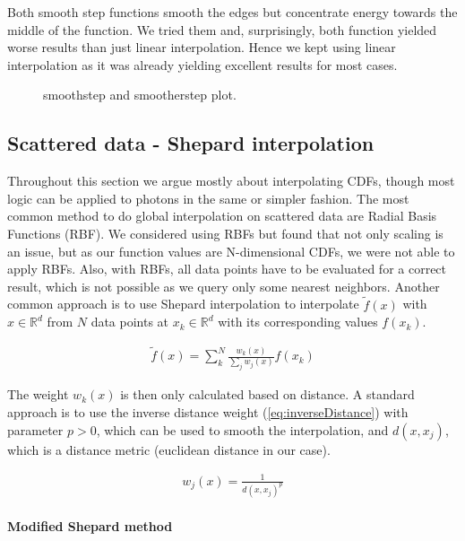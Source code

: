 Both smooth step functions smooth the edges but concentrate energy towards the middle of the function. We tried them and, surprisingly, both function yielded worse results than just linear interpolation. Hence we kept using linear interpolation as it was already yielding excellent results for most cases.

\begin{figure}[htbp] 
	\centering
	\tiny
    
    \caption{smoothstep and smootherstep plot. } 
    \label{fig:smoothstep}
\end{figure}

\subsection{Scattered data - Shepard interpolation}
\label{ch:unstructured}

Throughout this section we argue mostly about interpolating CDFs, though most logic can be applied to photons in the same or simpler fashion. The most common method to do global interpolation on scattered data are Radial Basis Functions (RBF). We considered using RBFs but found that not only scaling is an issue, but as our function values are N-dimensional CDFs, we were not able to apply RBFs. Also, with RBFs, all data points have to be evaluated for a correct result, which is not possible as we query only some nearest neighbors. Another common approach is to use Shepard interpolation to interpolate $\widetilde{f}(x)$ with $x \in \mathbb{R}^d$ from $N$ data points at $x_k \in \mathbb{R}^d$ with its corresponding values $f(x_k)$. 

\begin{align}\label{eq:shepard}
\widetilde{f}(x) = \sum_{k}^{N}\frac{w_k(x)}{\sum\nolimits_{j}w_j(x)}f(x_k)
\end{align}

The weight $w_k(x)$ is then only calculated based on distance. A standard approach is to use the inverse distance weight (\ref{eq:inverseDistance}) with parameter $p > 0$, which can be used to smooth the interpolation, and $d(x, x_j)$, which is a distance metric (euclidean distance in our case).

\begin{align}\label{eq:inverseDistance}
w_j(x) = \frac{1}{d(x, x_j)^p}
\end{align}


\paragraph{Modified Shepard method}
\label{ch:modshep}


